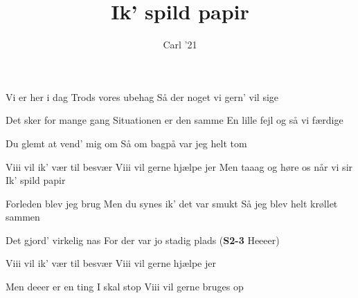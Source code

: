 \documentclass[a4paper,11pt]{article}
\title{Ik' spild papir}
\author{Carl '21}
\begin{document}
\maketitle

\begin{song}


 Vi er her i dag
        Trods vores ubehag
        Så der noget vi gern' vil sige

 Det sker for mange gang
        Situationen er den samme
        En lille fejl og så vi færdige

 Du glemt at vend' mig om
        Så om bagpå var jeg helt tom

 Viii vil ik' vær til besvær
        Viii vil gerne hjælpe  jer
        Men taaag og høre os når vi sir
        Ik' spild papir

 Forleden blev jeg brug
        Men du synes ik' det var smukt
        Så jeg blev helt krøllet sammen

 Det gjord' virkelig nas
        For der var jo stadig plads (\textbf{S2-3} Heeeer)

 Viii vil ik' vær til besvær
        Viii vil gerne hjælpe jer

 Men deeer er en ting I skal stop
        Viii vil gerne bruges op
\end{song}
\end{document}
